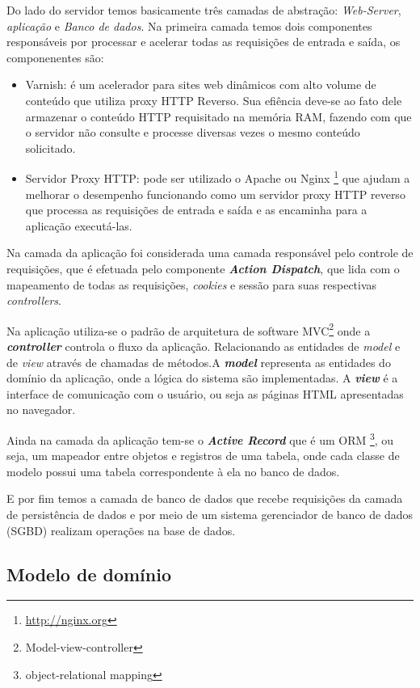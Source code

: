 Do lado do servidor temos basicamente três camadas de abstração: \textit{Web-Server}, \textit{aplicação} e \textit{Banco de dados}. Na primeira camada temos dois componentes responsáveis por processar e acelerar todas as requisições de entrada e saída, os componenentes são:
\begin{itemize}
\item Varnish: é um acelerador para sites web dinâmicos com alto volume de conteúdo que utiliza proxy HTTP Reverso. Sua efiência deve-se ao fato dele armazenar o conteúdo HTTP requisitado na memória RAM, fazendo com que o servidor não consulte e processe diversas vezes o mesmo conteúdo solicitado.
\item Servidor Proxy HTTP: pode ser utilizado o Apache ou Nginx \footnote{\url{http://nginx.org}} que ajudam a melhorar o desempenho funcionando como um servidor proxy HTTP reverso que processa as requisições de entrada e saída e as encaminha para a aplicação executá-las.
\end{itemize}

Na camada da aplicação foi considerada uma camada responsável pelo controle de requisições, que é efetuada pelo componente \textbf{\textit{Action Dispatch}}, que lida com o mapeamento de todas as requisições, \textit{cookies} e sessão para suas respectivas \textit{controllers}.

Na aplicação utiliza-se o padrão de arquitetura de software MVC\footnote{Model-view-controller} onde a \textbf{\textit{controller}} controla o fluxo da aplicação. Relacionando as entidades de \textit{model} e de \textit{view} através de chamadas de métodos.A \textbf{\textit{model}} representa as entidades do domínio da aplicação, onde a lógica do sistema são implementadas. A \textbf{\textit{view}} é a interface de comunicação com o usuário, ou seja as páginas HTML apresentadas no navegador.

Ainda na camada da aplicação tem-se o \textbf{\textit{Active Record}} que é um ORM \footnote{object-relational mapping}, ou seja, um mapeador entre objetos e registros de uma tabela, onde cada classe de modelo possui uma tabela correspondente à ela no banco de dados.

E por fim temos a camada de banco de dados que recebe requisições da camada de persistência de dados e por meio de um sistema gerenciador de banco de dados (SGBD) realizam operações na base de dados.

\subsection{Modelo de domínio}

